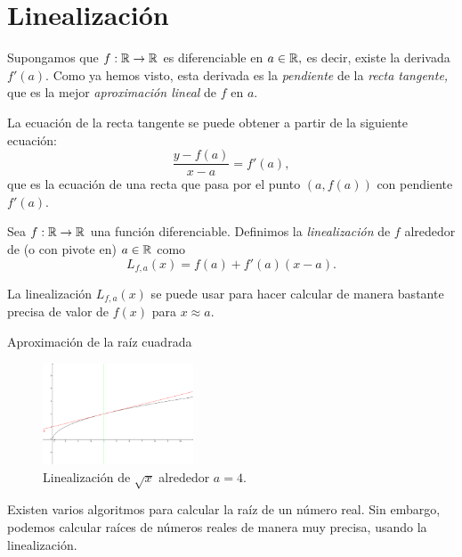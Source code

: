 
\section{Linealización}



    Supongamos que $f:\mathbb{R}\to\mathbb{R}$ es diferenciable en $a\in\mathbb{R},$ es decir, existe la derivada $f'(a).$ Como ya hemos visto,
    esta derivada es la \emph{pendiente} de la \emph{recta tangente,} que es la mejor \emph{aproximación
        lineal} de $f$ en $a.$



    La ecuación de la recta tangente se puede obtener a partir de la siguiente ecuación:
    $$
    \dfrac{y-f(a)}{x-a}=f'(a),
    $$
    que es la ecuación de una recta que pasa por el punto $(a,f(a))$ con pendiente $f'(a).$



    \begin{definicion}
        Sea $f:\mathbb{R} \to \mathbb{R}$ una función diferenciable. Definimos la \emph{linealización} de $f$ alrededor de (o con pivote en)
        $a\in \mathbb{R}$ como
        $$
        L_{f,a}(x)=f(a)+f'(a)(x-a).
        $$
    \end{definicion}



    La linealización $L_{f,a}(x)$ se puede usar para hacer calcular de manera bastante precisa de valor de $f(x)$ para
    $x\approx a.$


{Aproximación de la raíz cuadrada}
    
    \begin{figure}
        \centering
        \includegraphics[height=3cm,keepaspectratio=true]{./calculo/sqrt-linear.png}
        \caption{Linealización de $\sqrt{x}$ alrededor $a=4.$}
        \label{fig:sqrt}
    \end{figure}



    Existen varios algoritmos para calcular la raíz de un número real. Sin embargo, podemos calcular raíces de números
    reales de manera muy precisa, usando la linealización.




